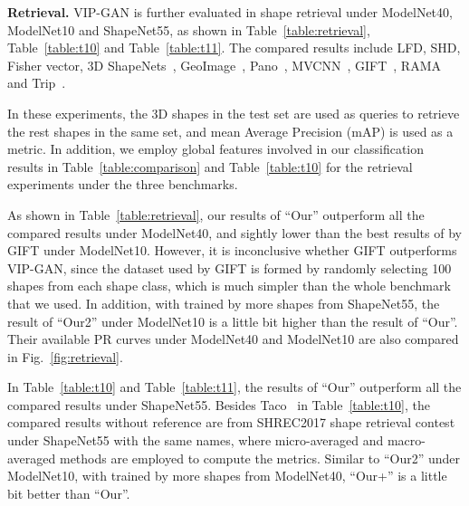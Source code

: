 \documentclass[letterpaper]{article} \usepackage{aaai19}  \usepackage{times}  \usepackage{helvet}  \usepackage{courier}  \usepackage{url}  \usepackage{graphicx}
\begin{document}
\noindent\textbf{Retrieval. }VIP-GAN is further evaluated in shape retrieval under ModelNet40, ModelNet10 and ShapeNet55, as shown in Table~\ref{table:retrieval}, Table~\ref{table:t10} and Table~\ref{table:t11}. The compared results include LFD, SHD, Fisher vector, 3D ShapeNets~\cite{Wu2015}, GeoImage~\cite{eccvSinha2017}, Pano~\cite{Bshi2015}, MVCNN~\cite{su15mvcnn}, GIFT~\cite{tmmbs2016}, RAMA~\cite{Sfikas17} and Trip~\cite{Xinweicvpr18}.




In these experiments, the 3D shapes in the test set are used as queries to retrieve the rest shapes in the same set, and mean Average Precision (mAP) is used as a metric. In addition, we employ global features involved in our classification results in Table~\ref{table:comparison} and Table~\ref{table:t10} for the retrieval experiments under the three benchmarks.

As shown in Table~\ref{table:retrieval}, our results of ``Our'' outperform all the compared results under ModelNet40, and sightly lower than the best results of  by GIFT under ModelNet10. However, it is inconclusive whether GIFT outperforms VIP-GAN, since the dataset used by GIFT is formed by randomly selecting 100 shapes from each shape class, which is much simpler than the whole benchmark that we used. In addition, with trained by more shapes from ShapeNet55, the result of ``Our2'' under ModelNet10 is a little bit higher than the result of ``Our''. Their available PR curves under ModelNet40 and ModelNet10 are also compared in Fig.~\ref{fig:retrieval}.

In Table~\ref{table:t10} and Table~\ref{table:t11}, the results of ``Our'' outperform all the compared results under ShapeNet55. Besides Taco~\cite{s2018spherical} in Table~\ref{table:t10}, the compared results without reference are from SHREC2017 shape retrieval contest~\cite{3dor20171050} under ShapeNet55 with the same names, where micro-averaged and macro-averaged methods are employed to compute the metrics. Similar to ``Our2'' under ModelNet10, with trained by more shapes from ModelNet40, ``Our+'' is a little bit better than ``Our''.
\end{document}
